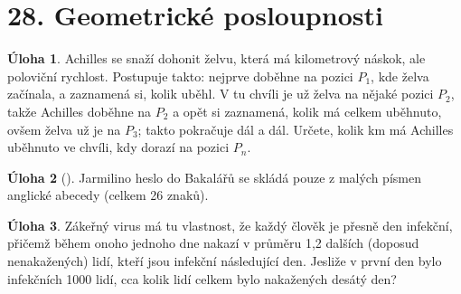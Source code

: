\documentclass[8pt,a5paper]{extarticle}
\def\tisk{%
\newbox\shipouthackbox
\pdfpagewidth=2\pdfpagewidth
\let\oldshipout=\shipout
\def\shipout{\afterassignment\zdvojtmp \setbox\shipouthackbox=}%
\def\zdvojtmp{\aftergroup\zdvoj}%
\def\zdvoj{%
    \oldshipout\vbox{\hbox{%
        \copy\shipouthackbox
        \hskip\dimexpr .5\pdfpagewidth-\wd\shipouthackbox\relax
        \box\shipouthackbox
    }}%
}}%
\let\results\newpage
\let\endresults\relax
\def\resultssame{%
    \long\def\results##1\endresults{%
        \noindent\rotatebox{180}{\vbox{##1}}%
    }%
}
\theoremstyle{definition}
\newtheorem{uloha}{\atr Úloha}
\let\ee\expandafter
\let\vysl\vyslplain
\def\locvysl#1{\ee\gdef\ee\locvysld\ee{\locvysld\item #1}}
\let\lv\locvysl
\newenvironment{ulohav}[1][]{\begin{uloha}[#1]\gdef\locvysld{\begin{enumerate*}}}{\ee\vyslplain\ee{\locvysld\end{enumerate*}}\end{uloha}}
\def\atr{}
\begin{document}


\section*{28. Geometrické posloupnosti}


\begin{uloha}
Achilles se snaží dohonit želvu, která má kilometrový náskok, ale poloviční rychlost. Postupuje takto: nejprve doběhne na pozici $P_1$, kde želva začínala, a zaznamená si, kolik uběhl. V tu chvíli je už želva na nějaké pozici $P_2$, takže Achilles doběhne na $P_2$ a opět si zaznamená, kolik má celkem uběhnuto, ovšem želva už je na $P_3$; takto pokračuje dál a dál. Určete, kolik km má Achilles uběhnuto ve chvíli, kdy dorazí na pozici $P_n$.\vysl{$2 - \bigl(\frac12\bigr)^{n-1}$}
\end{uloha}

\begin{ulohav}
Jarmilino heslo do Bakalářů se skládá pouze z malých písmen anglické abecedy (celkem 26 znaků).
\end{ulohav}


\begin{uloha}
Zákeřný virus má tu vlastnost, že každý člověk je přesně den infekční, přičemž během onoho jednoho dne nakazí v průměru 1,2 dalších (doposud nenakažených) lidí, kteří jsou infekční následující den. Jesliže v první den bylo infekčních 1000 lidí, cca kolik lidí celkem bylo nakažených desátý den?\vysl{cca 25\,959}
\end{uloha}
\end{document}
